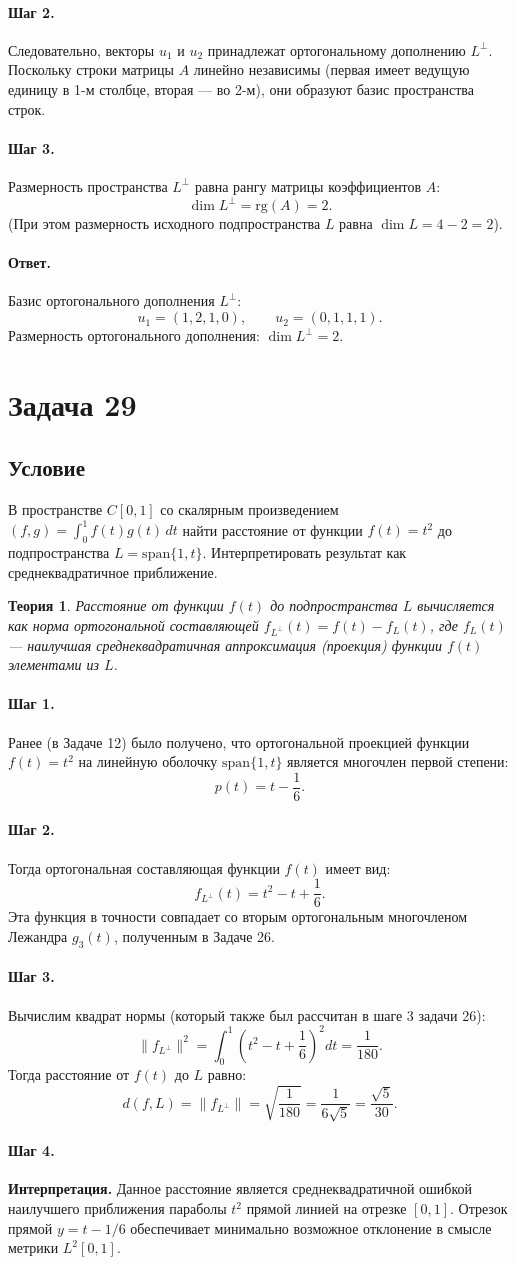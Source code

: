 \documentclass[12pt,a4paper]{article}
\theoremstyle{solution}
\newtheorem*{theory}{Теория}
\newcommand{\task}[1]{\newpage\section*{Задача #1}}
\newcommand{\answer}{\paragraph{Ответ.}}
\newcommand{\step}[1]{\paragraph{Шаг #1.}}
\begin{document}
\step{2} Следовательно, векторы $u_1$ и $u_2$ принадлежат ортогональному дополнению $L^\perp$. Поскольку строки матрицы $A$ линейно независимы (первая имеет ведущую единицу в 1-м столбце, вторая — во 2-м), они образуют базис пространства строк.

\step{3} Размерность пространства $L^\perp$ равна рангу матрицы коэффициентов $A$:
\[
\dim L^\perp = \mathrm{rg}(A) = 2.
\]
(При этом размерность исходного подпространства $L$ равна $\dim L = 4 - 2 = 2$).

\answer
Базис ортогонального дополнения $L^\perp$:
\[
u_1 = (1, 2, 1, 0), \qquad u_2 = (0, 1, 1, 1).
\]
Размерность ортогонального дополнения: $\dim L^\perp = 2$.

\task{29}
\subsection*{Условие}
В пространстве $C[0, 1]$ со скалярным произведением $(f, g) = \int_0^1 f(t)g(t)\,dt$ найти расстояние от функции $f(t) = t^2$ до подпространства $L = \mathrm{span}\{1, t\}$. Интерпретировать результат как среднеквадратичное приближение.

\begin{theory}
Расстояние от функции $f(t)$ до подпространства $L$ вычисляется как норма ортогональной составляющей $f_{L^\perp}(t) = f(t) - f_L(t)$, где $f_L(t)$ — наилучшая среднеквадратичная аппроксимация (проекция) функции $f(t)$ элементами из $L$.
\end{theory}

\step{1} Ранее (в Задаче 12) было получено, что ортогональной проекцией функции $f(t) = t^2$ на линейную оболочку $\mathrm{span}\{1, t\}$ является многочлен первой степени:
\[
p(t) = t - \frac{1}{6}.
\]

\step{2} Тогда ортогональная составляющая функции $f(t)$ имеет вид:
\[
f_{L^\perp}(t) = t^2 - t + \frac{1}{6}.
\]
Эта функция в точности совпадает со вторым ортогональным многочленом Лежандра $g_3(t)$, полученным в Задаче 26.

\step{3} Вычислим квадрат нормы (который также был рассчитан в шаге 3 задачи 26):
\[
\|f_{L^\perp}\|^2 = \int_0^1 \left(t^2 - t + \frac{1}{6}\right)^2 dt = \frac{1}{180}.
\]
Тогда расстояние от $f(t)$ до $L$ равно:
\[
d(f, L) = \|f_{L^\perp}\| = \sqrt{\frac{1}{180}} = \frac{1}{6\sqrt{5}} = \frac{\sqrt{5}}{30}.
\]

\step{4} \textbf{Интерпретация.} Данное расстояние является среднеквадратичной ошибкой наилучшего приближения параболы $t^2$ прямой линией на отрезке $[0, 1]$. Отрезок прямой $y = t - 1/6$ обеспечивает минимально возможное отклонение в смысле метрики $L^2[0, 1]$.
\end{document}
